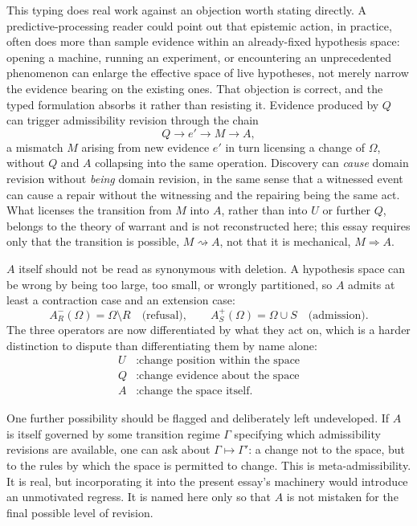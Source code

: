 \documentclass[11pt]{article}
\begin{document}
This typing does real work against an objection worth stating directly. A predictive-processing reader could point out that epistemic action, in practice, often does more than sample evidence within an already-fixed hypothesis space: opening a machine, running an experiment, or encountering an unprecedented phenomenon can enlarge the effective space of live hypotheses, not merely narrow the evidence bearing on the existing ones. That objection is correct, and the typed formulation absorbs it rather than resisting it. Evidence produced by $Q$ can trigger admissibility revision through the chain
\[
Q \longrightarrow e' \longrightarrow M \longrightarrow A,
\]
a mismatch $M$ arising from new evidence $e'$ in turn licensing a change of $\Omega$, without $Q$ and $A$ collapsing into the same operation. Discovery can \emph{cause} domain revision without \emph{being} domain revision, in the same sense that a witnessed event can cause a repair without the witnessing and the repairing being the same act. What licenses the transition from $M$ into $A$, rather than into $U$ or further $Q$, belongs to the theory of warrant and is not reconstructed here; this essay requires only that the transition is possible, $M \rightsquigarrow A$, not that it is mechanical, $M \Rightarrow A$.

$A$ itself should not be read as synonymous with deletion. A hypothesis space can be wrong by being too large, too small, or wrongly partitioned, so $A$ admits at least a contraction case and an extension case:
\[
A_R^-(\Omega) = \Omega \setminus R \quad \text{(refusal)}, \qquad
A_S^+(\Omega) = \Omega \cup S \quad \text{(admission)}.
\]
The three operators are now differentiated by what they act on, which is a harder distinction to dispute than differentiating them by name alone:
\[
\boxed{
\begin{aligned}
U &: \text{change position within the space} \\
Q &: \text{change evidence about the space} \\
A &: \text{change the space itself.}
\end{aligned}}
\]

One further possibility should be flagged and deliberately left undeveloped. If $A$ is itself governed by some transition regime $\Gamma$ specifying which admissibility revisions are available, one can ask about $\Gamma \mapsto \Gamma'$: a change not to the space, but to the rules by which the space is permitted to change. This is meta-admissibility. It is real, but incorporating it into the present essay's machinery would introduce an unmotivated regress. It is named here only so that $A$ is not mistaken for the final possible level of revision.
\end{document}
